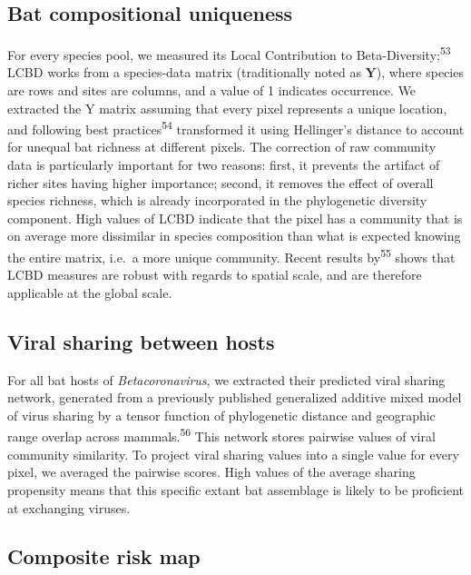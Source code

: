 \documentclass[11pt]{article}
\begin{document}
\hypertarget{bat-compositional-uniqueness}{%
\subsection{Bat compositional
uniqueness}\label{bat-compositional-uniqueness}}

For every species pool, we measured its Local Contribution to
Beta-Diversity;\textsuperscript{53} LCBD works from a species-data
matrix (traditionally noted as \(\mathbf{Y}\)), where species are rows
and sites are columns, and a value of 1 indicates occurrence. We
extracted the Y matrix assuming that every pixel represents a unique
location, and following best practices\textsuperscript{54} transformed
it using Hellinger's distance to account for unequal bat richness at
different pixels. The correction of raw community data is particularly
important for two reasons: first, it prevents the artifact of richer
sites having higher importance; second, it removes the effect of overall
species richness, which is already incorporated in the phylogenetic
diversity component. High values of LCBD indicate that the pixel has a
community that is on average more dissimilar in species composition than
what is expected knowing the entire matrix, i.e.~a more unique
community. Recent results by\textsuperscript{55} shows that LCBD
measures are robust with regards to spatial scale, and are therefore
applicable at the global scale.

\hypertarget{viral-sharing-between-hosts}{%
\subsection{Viral sharing between
hosts}\label{viral-sharing-between-hosts}}

For all bat hosts of \emph{Betacoronavirus}, we extracted their
predicted viral sharing network, generated from a previously published
generalized additive mixed model of virus sharing by a tensor function
of phylogenetic distance and geographic range overlap across
mammals.\textsuperscript{56} This network stores pairwise values of
viral community similarity. To project viral sharing values into a
single value for every pixel, we averaged the pairwise scores. High
values of the average sharing propensity means that this specific extant
bat assemblage is likely to be proficient at exchanging viruses.

\hypertarget{composite-risk-map}{%
\subsection{Composite risk map}\label{composite-risk-map}}
\end{document}
